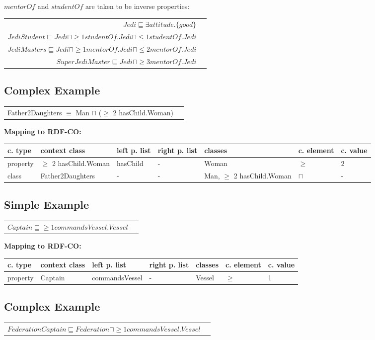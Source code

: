 \documentclass{llncs}
\newenvironment{gcotable}{
  \scriptsize
  \sffamily
  \vspace{0cm}
	\begin{center}
	\textbf{\vspace{0.4cm}Mapping to RDF-CO:} \\
  \begin{tabular}{l|l|l|l|l|l|l}
	\hline
  \textbf{c. type} & \textbf{context class} & \textbf{left p. list} & \textbf{right p. list} & \textbf{classes} & \textbf{c. element} & \textbf{c. value} \\
  \hline

}{
  \hline
  \end{tabular}
	\end{center}
}
\newenvironment{DL}{
  \vspace{0cm}
	\begin{center}
  \begin{tabular}{r l}

}{
  \end{tabular}
	\end{center}
}
\begin{document}
\noindent $mentorOf$ and $studentOf$ are taken to be inverse properties:\\

\begin{DL}
$Jedi \sqsubseteq \exists attitude.\{good\} $\\
$JediStudent \sqsubseteq Jedi \sqcap \geq1 studentOf.Jedi \sqcap \leq1 studentOf.Jedi$ \\
$JediMasters \sqsubseteq Jedi \sqcap \geq1 mentorOf.Jedi \sqcap \leq2 mentorOf.Jedi $\\
$SuperJediMaster \sqsubseteq Jedi \sqcap  \geq3 mentorOf.Jedi $
\end{DL}

\subsection{Complex Example}

\begin{DL}
Father2Daughters $\equiv$ Man $\sqcap$ ($\geq$ 2 hasChild.Woman)
\end{DL}

\begin{gcotable}
property & $\geq$ 2 hasChild.Woman & hasChild & - & Woman & $\geq$ & 2 \\
class & Father2Daughters & - & - & Man, $\geq$ 2 hasChild.Woman & $\sqcap$ & - \\
\end{gcotable}

\subsection{Simple Example}

\begin{DL}
$Captain \sqsubseteq \geq1 commandsVessel . Vessel $
\end{DL}

\begin{gcotable}
property & Captain & commandsVessel & - & Vessel & $\geq$ & 1 \\
\end{gcotable}

\subsection{Complex Example}

\begin{DL}
$FederationCaptain \sqsubseteq Federation \sqcap \geq1 commandsVessel . Vessel $
\end{DL}
\end{document}
